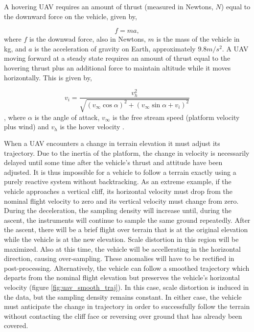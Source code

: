 \documentclass[10pt,a4paper]{report}
\begin{document}
A hovering UAV requires an amount of thrust (measured in Newtons, $N$) equal to the downward force on the vehicle, given by, 

\begin{equation}
f = ma,
\label{eq:hover_force}
\end{equation} where $f$ is the downwad force, also in Newtons, $m$ is the mass of the vehicle in kg, and $a$ is the acceleration of gravity on Earth, approximately $9.8m/s^2$. A UAV moving forward at a steady state requires an amount of thrust equal to the hovering thrust plus an additional force to maintain altitude while it moves horizontally. This is given by,

\begin{equation}
v_i = \dfrac{ v_h^2 } { \sqrt{ (v_\infty \cos \alpha)^2 + (v_\infty \sin \alpha + v_i)^2 } } 
\label{eq:move_force}
\end{equation}, where $\alpha$ is the angle of attack, $v_\infty$ is the free stream speed (platform velocity plus wind) and $v_h$ is the hover velocity \cite{Hoffmann2007}.

When a UAV encounters a change in terrain elevation it must adjust its trajectory. Due to the inertia of the platform, the change in velocity is  necessarily delayed until some time after the vehicle's thrust and attitude have been adjusted. It is thus impossible for a vehicle to follow a terrain exactly using a purely reactive system without backtracking. As an extreme example, if the vehicle approaches a vertical cliff, its horizontal velocity must drop from the nominal flight velocity to zero and its vertical velocity must change from zero. During the deceleration, the sampling density will increase until, during the ascent, the instruments will continue to sample the same ground repeatedly. After the ascent, there will be a brief flight over terrain that is at the original elevation while the vehicle is at the new elevation. Scale distortion in this region will be maximized. Also at this time, the vehicle will be accellerating in the horizontal direction, causing over-sampling. These anomalies will have to be rectified in post-processing. Alternatively, the vehicle can follow a smoothed trajectory which departs from the nominal flight elevation but preserves the vehicle's horizontal velocity (figure \ref{fig:uav_smooth_traj}). In this case, scale distortion is induced in the data, but the sampling density remains constant. In either case, the vehicle must anticipate the change in trajectory in order to successfully follow the terrain without contacting the cliff face or reversing over ground that has already been covered.
\end{document}
